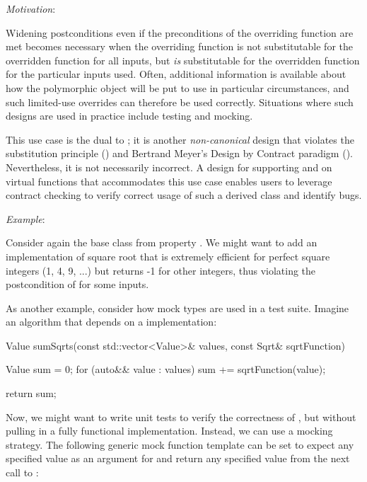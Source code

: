 \emph{Motivation}:

Widening postconditions even if the preconditions of the overriding function are met becomes necessary when the overriding function is not substitutable for the overridden function for all inputs, but \emph{is} substitutable for the overridden function for the particular inputs used. Often, additional information is available about how the polymorphic object will be put to use in particular circumstances, and such limited-use overrides can therefore be used correctly. Situations where such designs are used in practice include testing and mocking. 

This use case is the dual to ; it is another \emph{non-canonical} design that violates the substitution principle () and Bertrand Meyer's Design by Contract paradigm (). Nevertheless, it is not necessarily incorrect. A design for supporting  and  on virtual functions that accommodates this use case enables users to leverage contract checking to verify correct usage of such a derived class and identify bugs.

\emph{Example}:

Consider again the base class  from property . We might want to add an implementation of square root  that is extremely efficient for perfect square integers (1, 4, 9, ...) but returns -1 for other integers, thus violating the postcondition of  for some inputs.

As another example, consider how mock types are used in a test suite. Imagine an algorithm that depends on a  implementation:

\begin{codeblock}
Value sumSqrts(const std::vector<Value>& values, const Sqrt& sqrtFunction) {
  Value sum = 0;
  for (auto&& value : values)
    sum += sqrtFunction(value);
    
  return sum;
}
\end{codeblock}

Now, we might want to write unit tests to verify the correctness of , but without pulling in a fully functional  implementation. Instead, we can use a mocking strategy. The following generic mock function template can be set to expect any specified value as an argument for and return any specified value from the next call to :

